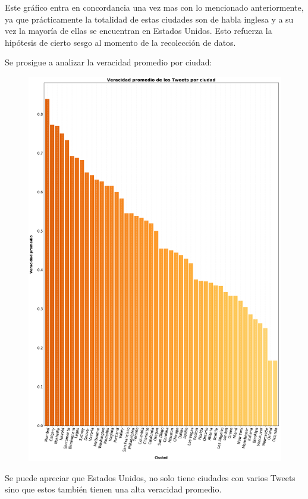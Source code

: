 \documentclass[titlepage,a4paper]{article}
\begin{document}
    Este gráfico entra en concordancia una vez mas con lo mencionado anteriormente, ya que prácticamente la totalidad de estas ciudades son de habla inglesa y a su vez la mayoría de ellas se encuentran en Estados Unidos. Esto refuerza la hipótesis de cierto sesgo al momento de la recolección de datos. 
    
    Se prosigue a analizar la veracidad promedio por ciudad:
    
    \begin{figure}[H]
    \centering
    \includegraphics[width=1\textwidth]{graficos/Analisis de Locacion/veracidad_promedio_de_los_tweets_por_ciudad.png}
    \caption{}
    \end{figure}
    
    Se puede apreciar que Estados Unidos, no solo tiene ciudades con varios Tweets sino que estos también tienen una alta veracidad promedio.
    
\end{document}
